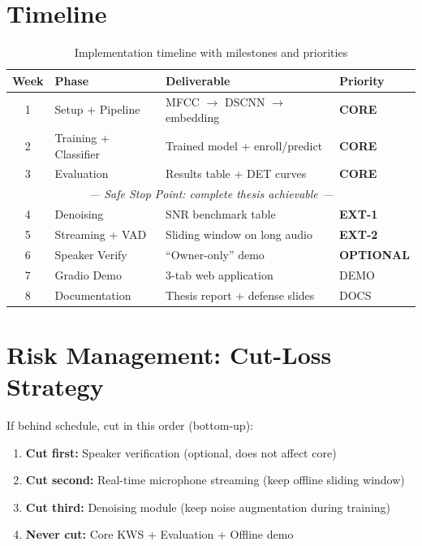\documentclass[12pt,a4paper]{report}
\begin{document}
\section{Timeline}

\begin{table}[h]
\centering
\caption{Implementation timeline with milestones and priorities}
\label{tab:timeline}
\begin{tabular}{clll}
\toprule
\textbf{Week} & \textbf{Phase} & \textbf{Deliverable} & \textbf{Priority} \\
\midrule
1 & Setup + Pipeline & MFCC $\to$ DSCNN $\to$ embedding &
    \textcolor{corecolor}{\textbf{CORE}} \\
2 & Training + Classifier & Trained model + enroll/predict &
    \textcolor{corecolor}{\textbf{CORE}} \\
3 & Evaluation & Results table + DET curves &
    \textcolor{corecolor}{\textbf{CORE}} \\
\midrule
\multicolumn{4}{c}{\textit{--- Safe Stop Point: complete thesis achievable ---}} \\
\midrule
4 & Denoising & SNR benchmark table &
    \textcolor{ext1color}{\textbf{EXT-1}} \\
5 & Streaming + VAD & Sliding window on long audio &
    \textcolor{ext2color}{\textbf{EXT-2}} \\
6 & Speaker Verify & ``Owner-only'' demo &
    \textcolor{optcolor}{\textbf{OPTIONAL}} \\
7 & Gradio Demo & 3-tab web application &
    DEMO \\
8 & Documentation & Thesis report + defense slides &
    DOCS \\
\bottomrule
\end{tabular}
\end{table}

\section{Risk Management: Cut-Loss Strategy}

If behind schedule, cut in this order (bottom-up):
\begin{enumerate}
    \item \textbf{Cut first:} Speaker verification (optional, does not affect
          core)
    \item \textbf{Cut second:} Real-time microphone streaming (keep offline
          sliding window)
    \item \textbf{Cut third:} Denoising module (keep noise augmentation
          during training)
    \item \textbf{Never cut:} Core KWS + Evaluation + Offline demo
\end{enumerate}
\end{document}
